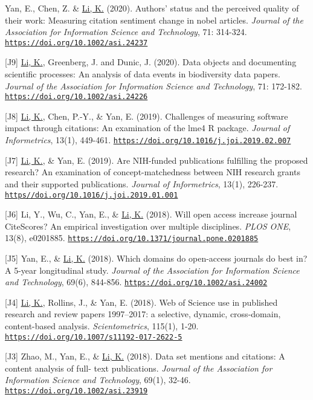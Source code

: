 \documentclass[margin, 10pt]{res} %
\begin{document}
\begin{resume}
[J10] Yan, E., Chen, Z. \& \underline{Li, K.} (2020). Authors' status and the perceived quality of their work: Measuring citation sentiment change in nobel articles. \textit{Journal of the Association for Information Science and Technology}, 71: 314-324. \href{https://doi.org/10.1002/asi.24237}{\nolinkurl{https://doi.org/10.1002/asi.24237}}

[J9] \underline{Li, K.}, Greenberg, J. and Dunic, J. (2020). Data objects and documenting scientific processes: An analysis of data events in biodiversity data papers. \textit{Journal of the Association for Information Science and Technology}, 71: 172-182. \href{https://doi.org/10.1002/asi.24226}{\nolinkurl{https://doi.org/10.1002/asi.24226}}

[J8] \underline{Li, K.}, Chen, P.-Y., \& Yan, E. (2019). Challenges of measuring software impact through citations: An examination of the lme4 R package. \textit{Journal of Informetrics}, 13(1), 449-461. \href{https://doi.org/10.1016/j.joi.2019.02.007}{\nolinkurl{https://doi.org/10.1016/j.joi.2019.02.007}}

[J7] \underline{Li, K.}, \& Yan, E. (2019). Are NIH-funded publications fulfilling the proposed research? An examination of concept-matchedness between NIH research grants and their supported publications. \textit{Journal of Informetrics}, 13(1), 226-237. \href{https//doi.org/10.1016/j.joi.2019.01.001}{\nolinkurl{https//doi.org/10.1016/j.joi.2019.01.001}}

[J6] Li, Y., Wu, C., Yan, E., \& \underline{Li, K.} (2018). Will open access increase journal CiteScores? An empirical investigation over multiple disciplines. \textit{PLOS ONE}, 13(8), e0201885. \href{https://doi.org/10.1371/journal.pone.0201885}{\nolinkurl{https://doi.org/10.1371/journal.pone.0201885}}

[J5] Yan, E., \& \underline{Li, K.} (2018). Which domains do open-access journals do best in? A 5-year longitudinal study. \textit{Journal of the Association for Information Science and Technology}, 69(6), 844-856. \href{https://doi.org/10.1002/asi.24002}{\nolinkurl{https://doi.org/10.1002/asi.24002}}

[J4] \underline{Li, K.}, Rollins, J., \& Yan, E. (2018). Web of Science use in published research and review papers 1997–2017: a selective, dynamic, cross-domain, content-based analysis. \textit{Scientometrics}, 115(1), 1-20. \href{https://doi.org/10.1007/s11192-017-2622-5}{\nolinkurl{https://doi.org/10.1007/s11192-017-2622-5}} 

[J3] Zhao, M., Yan, E., \& \underline{Li, K.} (2018). Data set mentions and citations: A content analysis of full- text publications. \textit{Journal of the Association for Information Science and Technology}, 69(1), 32-46. \href{https://doi.org/10.1002/asi.23919}{\nolinkurl{https://doi.org/10.1002/asi.23919}}


\end{resume}
\end{document}
